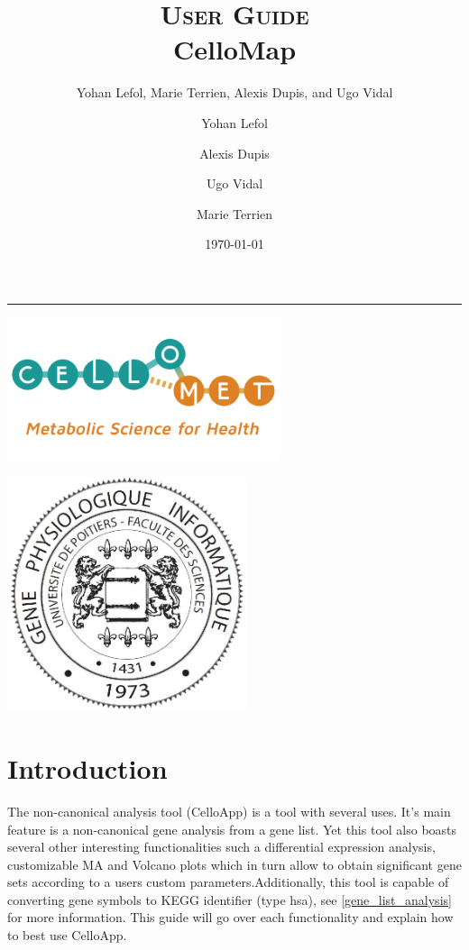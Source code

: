 \documentclass[11pt]{article}
\author{Yohan Lefol, Marie Terrien, Alexis Dupis, and Ugo Vidal}
\title{
\textsc{User Guide}\\[2.6cm]
{\LARGE \bfseries CelloMap}
}
\author{
Yohan Lefol
\and 
Alexis Dupis
\and
Ugo Vidal
\and
Marie Terrien
}
\date{
\today
}
\begin{document}
\maketitle
\hrule
\begin{center}
\includegraphics[width = 8cm]{logo-CELLOMET-a.png}
\end{center}

\begin{center}
\includegraphics[width = 7cm]{Logo-Master-GPhy.png}
\end{center}
\thispagestyle{empty}

\doublespacing
\tableofcontents
\singlespacing

\newpage
\section{Introduction \label{intro}}
The non-canonical analysis tool (CelloApp) is a tool with several uses. It's main feature is a non-canonical gene analysis from a gene list. Yet this tool also boasts several other interesting functionalities such a differential expression analysis, customizable MA and Volcano plots which in turn allow to obtain significant gene sets according to a users custom parameters.Additionally, this tool is capable of converting gene symbols to KEGG identifier (type hsa), see \autoref{gene_list_analysis} for more information.
This guide will go over each functionality and explain how to best use CelloApp.
\end{document}
